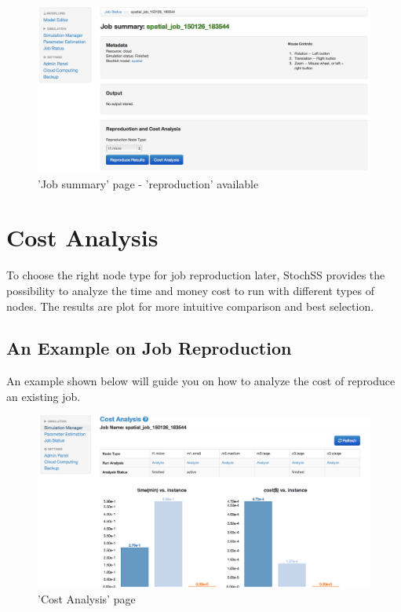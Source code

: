 \begin{figure}[!ht]
\centering
\includegraphics[scale=0.35]{T6/T6_fig_reproduction1.png}
\caption{'Job summary' page - 'reproduction' available}
\label{fig:2}
\end{figure}

\newpage

\section{Cost Analysis}
To choose the right node type for job reproduction later, StochSS provides the possibility to analyze the time and money cost to run with different types of nodes. The results are plot for more intuitive comparison and best selection.

\subsection{An Example on Job Reproduction}
An example shown below will guide you on how to analyze the cost of reproduce an existing job.

\begin{figure}[!ht]
\centering
\includegraphics[scale=0.35]{T6/T6_fig_costanalysis.png}
\caption{'Cost Analysis' page}
\label{fig:2}
\end{figure}

